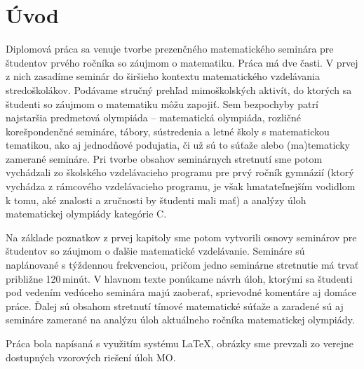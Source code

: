 \newcommand{\imagesuffix}{}
\newcommand{\weblinks}[1]{}

\HlavickaUvod
\setcounter{page}{1}

\chapter*{Úvod}
\label{chap:intro}


Diplomová práca sa venuje tvorbe prezenčného matematického seminára pre študentov prvého ročníka so záujmom o matematiku. Práca má dve časti. V prvej z nich zasadíme seminár do širšieho kontextu matematického vzdelávania stredoškolákov. Podávame stručný prehľad mimoškolských aktivít, do ktorých sa študenti so záujmom o matematiku môžu zapojiť. Sem bezpochyby patrí najstaršia predmetová olympiáda -- matematická olympiáda, rozličné korešpondenčné semináre, tábory, sústredenia a letné školy s matematickou tematikou, ako aj jednodňové podujatia, či už sú to súťaže alebo (ma)tematicky zamerané semináre. Pri tvorbe obsahov seminárnych stretnutí sme potom vychádzali zo školského vzdelávacieho programu pre prvý ročník gymnázií (ktorý vychádza z rámcového vzdelávacieho programu, je však hmatateľnejším vodidlom k tomu, aké znalosti a zručnosti by študenti mali mať) a analýzy úloh matematickej olympiády kategórie C.

Na základe poznatkov z prvej kapitoly sme potom vytvorili osnovy seminárov pre študentov so záujmom o ďalšie matematické vzdelávanie. Semináre sú naplánované s týždennou frekvenciou, pričom jedno seminárne stretnutie má trvať približne 120\,minút. V hlavnom texte ponúkame návrh úloh, ktorými sa študenti pod vedením vedúceho seminára majú zaoberať, sprievodné komentáre aj domáce práce. Ďalej sú obsahom stretnutí tímové matematické súťaže a zaradené sú aj semináre zamerané na analýzu úloh aktuálneho ročníka matematickej olympiády.

Práca bola napísaná s využitím systému \LaTeX, obrázky sme prevzali zo verejne dostupných vzorových riešení úloh MO.


